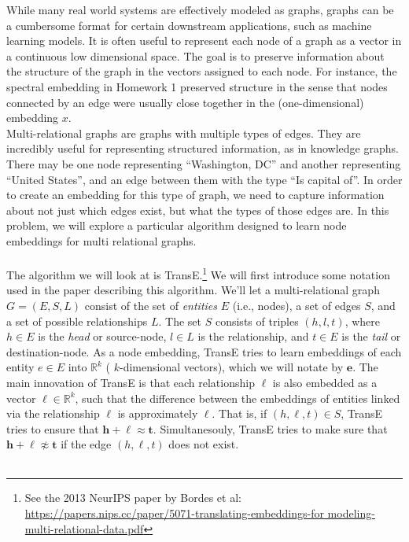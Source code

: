 \documentclass{article}
\begin{document}
While many real world systems are effectively modeled as graphs, graphs can be a cumbersome format for certain downstream applications, such as machine learning models. It is often useful to represent each node of a graph as a vector in a continuous low dimensional space. The goal is to preserve information about the structure of the graph in the vectors assigned to each node. For instance, the spectral embedding in Homework 1 preserved structure in the sense that nodes connected by an edge were usually close together in the (one-dimensional) embedding $x$.\\

\noindent Multi-relational graphs are graphs with multiple types of edges. They are incredibly useful for representing structured information, as in knowledge graphs. There may be one node representing “Washington, DC” and another representing “United States”, and an edge between them with the type “Is capital of”. In order to create an embedding for this type of graph, we need to capture information about not just which edges exist, but what the types of those edges are. In this problem, we will explore a particular algorithm designed to learn node embeddings for multi relational graphs. \\\\
The algorithm we will look at is TransE.\footnote{See the 2013 NeurIPS paper by Bordes et al: \url{https://papers.nips.cc/paper/5071-translating-embeddings-for modeling-multi-relational-data.pdf}}
We will first introduce some notation used in the paper describing this algorithm.
We’ll let a multi-relational graph $G = (E, S, L)$ consist of the set of \textit{entities} $E$ (i.e., nodes), a set of edges $S$, and a set of possible relationships $L$.
The set $S$ consists of triples $(h, l, t)$, where $h \in E$ is the \textit{head} or source-node, $l \in L$ is the relationship, and $t \in E$ is the \textit{tail} or destination-node.
As a node embedding, TransE tries to learn embeddings of each entity $e \in E$ into $\mathbb{R}^k$ ( $k$-dimensional vectors), which we will notate by $\mathbf{e}$. The main innovation of TransE is that each relationship $\ell$ is also embedded as a vector $\ell \in \mathbb{R}^k$, such that the difference between the embeddings of entities linked via the relationship $\ell$ is approximately $\ell$. That is, if $(h, \ell, t) \in S$, TransE tries to ensure that $\mathbf{h}+\boldsymbol{\ell} \approx \mathbf{t}$. Simultanesouly, TransE tries to make sure that $\mathbf{h}+\boldsymbol{\ell} \not\approx \mathbf{t}$ if the edge $(h, \ell, t)$ does not exist.\\\\
\end{document}
